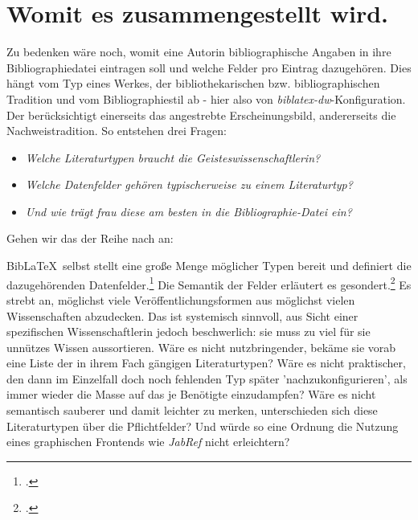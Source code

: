 
\section{Womit es zusammengestellt wird.}

Zu bedenken wäre noch, womit eine Autorin bibliographische Angaben in ihre Bibliographiedatei eintragen soll und welche Felder pro Eintrag dazugehören. Dies hängt vom Typ eines Werkes, der bibliothekarischen bzw. bibliographischen Tradition und vom Bibliographiestil ab - hier also von \emph{biblatex-dw}-Konfiguration. Der berücksichtigt einerseits das angestrebte Erscheinungsbild, andererseits die Nachweistradition. So entstehen drei Fragen:
\begin{itemize}
  \item \emph{Welche Literaturtypen braucht die Geisteswissenschaftlerin?}
  \item \emph{Welche Datenfelder gehören typischerweise zu einem Literaturtyp?}
  \item \emph{Und wie trägt frau diese am besten in die Bibliographie-Datei ein?}
\end{itemize}

Gehen wir das der Reihe nach an:

Bib\LaTeX\ selbst stellt eine große Menge möglicher Typen bereit und definiert die dazugehörenden Datenfelder.\footcite[vgl.][S. 8ff]{BibLaTeX2021a} Die Semantik der Felder erläutert es gesondert.\footcite[vgl.][S. 33ff]{BibLaTeX2021a} Es strebt an, möglichst viele Veröffentlichungsformen aus möglichst vielen Wissenschaften abzudecken. Das ist systemisch sinnvoll, aus Sicht einer spezifischen Wissenschaftlerin jedoch beschwerlich: sie muss zu viel für sie unnützes Wissen aussortieren. Wäre es nicht nutzbringender, bekäme sie vorab eine Liste der in ihrem Fach gängigen Literaturtypen? Wäre es nicht praktischer, den dann im Einzelfall doch noch fehlenden Typ später 'nachzukonfigurieren', als immer wieder die Masse auf das je Benötigte einzudampfen? Wäre es nicht semantisch sauberer und damit leichter zu merken, unterschieden sich diese Literaturtypen über die Pflichtfelder? Und würde so eine Ordnung die Nutzung eines graphischen Frontends wie \emph{JabRef} nicht erleichtern?

